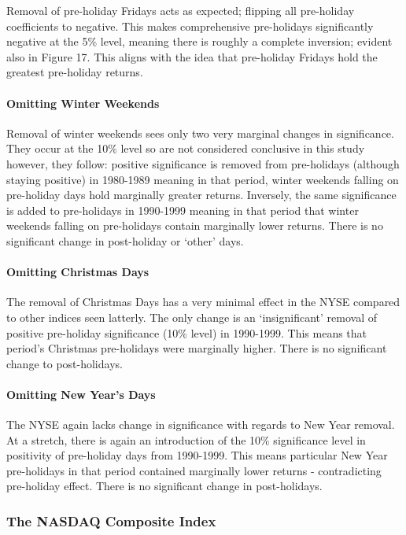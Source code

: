 \documentclass[11pt, english]{article}
\begin{document}
			Removal of pre-holiday Fridays acts as expected; flipping all pre-holiday coefficients to negative. This makes comprehensive pre-holidays significantly negative at the 5\% level, meaning there is roughly a complete inversion; evident also in Figure 17. This aligns with the idea that pre-holiday Fridays hold the greatest pre-holiday returns.

			\paragraph{Omitting Winter Weekends}

			Removal of winter weekends sees only two very marginal changes in significance. They occur at the 10\% level so are not considered conclusive in this study however, they follow: positive significance is removed from pre-holidays (although staying positive) in 1980-1989 meaning in that period, winter weekends falling on pre-holiday days hold marginally greater returns. Inversely, the same significance is added to pre-holidays in 1990-1999 meaning in that period that winter weekends falling on pre-holidays contain marginally lower returns. There is no significant change in post-holiday or `other’ days.

			\paragraph{Omitting Christmas Days}

			The removal of Christmas Days has a very minimal effect in the NYSE compared to other indices seen latterly. The only change is an `insignificant' removal of positive pre-holiday significance (10\% level) in 1990-1999. This means that period’s Christmas pre-holidays were marginally higher. There is no significant change to post-holidays.

			\paragraph{Omitting New Year’s Days}

			The NYSE again lacks change in significance with regards to New Year removal. At a stretch, there is again an introduction of the 10\% significance level in positivity of pre-holiday days from 1990-1999. This means particular New Year pre-holidays in that period contained marginally lower returns - contradicting pre-holiday effect. There is no significant change in post-holidays.

		\subsubsection{The NASDAQ Composite Index}
\end{document}
